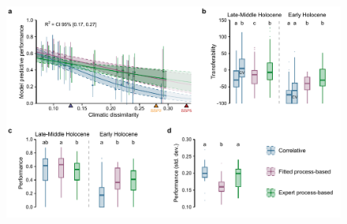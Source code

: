 \documentclass[pdflatex, sn-nature]{sn-jnl}%
\begin{document}
\begin{figure}[ht]
\centering
\hspace*{-0.8in}
\includegraphics[scale=0.9]{past_performance.pdf}
\begin{adjustwidth}{-0.5cm}{-0.5cm}

\end{adjustwidth}
\end{figure}
\end{document}
